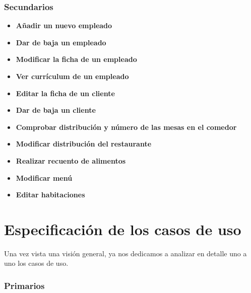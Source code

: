 \documentclass[spanish,a4paper,12pt]{report}	%
\begin{document}
\section{Secundarios}			%
	\begin{itemize}
	\item \textbf{Añadir un nuevo empleado}
	\item \textbf{Dar de baja un empleado}
	\item \textbf{Modificar la ficha de un empleado}
	\item \textbf{Ver currículum de un empleado}
	\item \textbf{Editar la ficha de un cliente}
	\item \textbf{Dar de baja un cliente}
	\item \textbf{Comprobar distribución y número de las mesas en el comedor}
	\item \textbf{Modificar distribución del restaurante}
	\item \textbf{Realizar recuento de alimentos}
	\item \textbf{Modificar menú}
	\item \textbf{Editar habitaciones}

	\end{itemize}


\newpage
\mbox{}
\thispagestyle{empty}						%
\newpage

\setcounter{section}{0}

\part{Especificación de los casos de uso} %
Una vez vista una visión general, ya nos dedicamos a analizar en detalle uno a uno los casos de uso.
\section{Primarios}		 			

\end{document}
